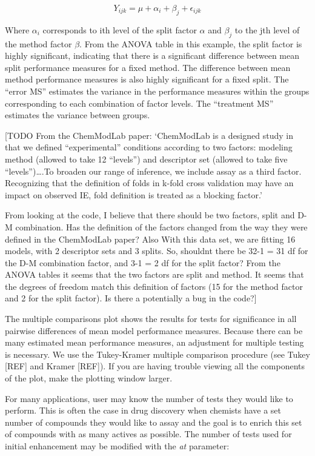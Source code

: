 \[Y_{ijk} = \mu + \alpha_i + \beta_j + \epsilon_{ijk}\]

Where \(\alpha_i\) corresponds to ith level of the split factor
\(\alpha\) and \(\beta_j\) to the jth level of the method factor
\(\beta\). From the ANOVA table in this example, the split factor is
highly significant, indicating that there is a significant difference
between mean split performance measures for a fixed method. The
difference between mean method performance measures is also highly
significant for a fixed split. The ``error MS'' estimates the variance
in the performance measures within the groups corresponding to each
combination of factor levels. The ``treatment MS'' estimates the
variance between groups.

{[}TODO From the ChemModLab paper: `ChemModLab is a designed study in
that we defined ``experimental'' conditions according to two factors:
modeling method (allowed to take 12 ``levels'') and descriptor set
(allowed to take five ``levels'')\ldots{}.To broaden our range of
inference, we include assay as a third factor. Recognizing that the
definition of folds in k-fold cross validation may have an impact on
observed IE, fold definition is treated as a blocking factor.'

From looking at the code, I believe that there should be two factors,
split and D-M combination. Has the definition of the factors changed
from the way they were defined in the ChemModLab paper? Also With this
data set, we are fitting 16 models, with 2 descriptor sets and 3 splits.
So, shouldnt there be 32-1 = 31 df for the D-M combination factor, and
3-1 = 2 df for the split factor? From the ANOVA tables it seems that the
two factors are split and method. It seems that the degrees of freedom
match this definition of factors (15 for the method factor and 2 for the
split factor). Is there a potentially a bug in the code?{]}

The multiple comparisons plot shows the results for tests for
significance in all pairwise differences of mean model performance
measures. Because there can be many estimated mean performance measures,
an adjustment for multiple testing is necessary. We use the Tukey-Kramer
multiple comparison procedure (see Tukey {[}REF{]} and Kramer
{[}REF{]}). If you are having trouble viewing all the components of the
plot, make the plotting window larger.

For many applications, user may know the number of tests they would like
to perform. This is often the case in drug discovery when chemists have
a set number of compounds they would like to assay and the goal is to
enrich this set of compounds with as many actives as possible. The
number of tests used for initial enhancement may be modified with the
\emph{at} parameter:

